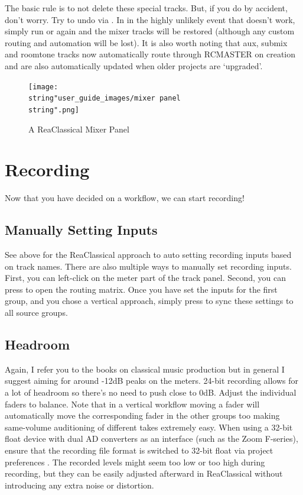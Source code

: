 \documentclass[10pt,american]{article}
\begin{document}
The basic rule is to not delete these special tracks. But, if you do by
accident, don't worry. Try to undo via . In in the highly unlikely
event that doesn't work, simply run  or  again and the mixer
tracks will be restored (although any custom routing and automation will be
lost). It is also worth noting that aux, submix and roomtone tracks now
automatically route through RCMASTER on creation and are also automatically
updated when older projects are `upgraded'.

\begin{figure}
\begin{centering}
\texttt{[image: \\string"user\_guide\_images/mixer panel\\string".png]}
\par\end{centering}
\caption{A ReaClassical Mixer Panel}

\end{figure}


\section{Recording}

Now that you have decided on a workflow, we can start recording!

\subsection{Manually Setting Inputs}

See above for the ReaClassical approach to auto setting recording inputs based
on track names. There are also multiple ways to manually set recording inputs.
First, you can left-click on the meter part of the track panel. Second, you can
press  to open the routing matrix. Once you have set the inputs for
the first group, and you chose a vertical approach, simply press  to
sync these settings to all source groups.

\subsection{Headroom}

Again, I refer you to the books on classical music production but in general I
suggest aiming for around -12dB peaks on the meters. 24-bit recording allows for
a lot of headroom so there's no need to push close to 0dB. Adjust the individual
faders to balance. Note that in a vertical workflow moving a fader will
automatically move the corresponding fader in the other groups too making
same-volume auditioning of different takes extremely easy. When using a 32-bit
float device with dual AD converters as an interface (such as the Zoom
F-series), ensure that the recording file format is switched to 32-bit float via
project preferences . The recorded levels might seem too low or too high
during recording, but they can be easily adjusted afterward in ReaClassical
without introducing any extra noise or distortion.
\end{document}
